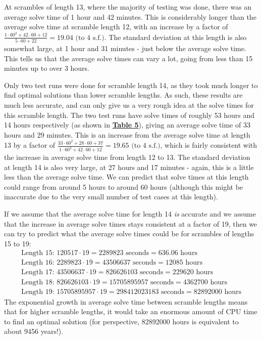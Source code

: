 At scrambles of length 13, where the majority of testing was done, there was an average solve time of 1 hour and 42 minutes. This is considerably longer than the average solve time at scramble length 12, with an increase by a factor of $\frac{1\cdot60^2 + 42\cdot60 + 12}{5\cdot60+22}= 19.04 \text{ (to 4 s.f.)}$. The standard deviation at this length is also somewhat large, at 1 hour and 31 minutes - just below the average solve time. This tells us that the average solve times can vary a lot, going from less than 15 minutes up to over 3 hours.

Only two test runs were done for scramble length 14, as they took much longer to find optimal solutions than lower scramble lengths. As such, these results are much less accurate, and can only give us a very rough idea at the solve times for this scramble length. The two test runs have solve times of roughly 53 hours and 14 hours respectively (as shown in \textbf{\hyperref[tab:results-4]{Table 5}}), giving an average solve time of 33 hours and 29 minutes. This is an increase from the average solve time at length 13 by a factor of $\frac{33\cdot60^2 + 28\cdot60 + 37}{1\cdot60^2 + 42\cdot60 + 12}= 19.65 \text{ (to 4 s.f.)}$, which is fairly consistent with the increase in average solve time from length 12 to 13. The standard deviation at length 14 is also very large, at 27 hours and 17 minutes - again, this is a little less than the average solve time. We can predict that solve times at this length could range from around 5 hours to around 60 hours (although this might be inaccurate due to the very small number of test cases at this length).

If we assume that the average solve time for length 14 \textit{is} accurate and we assume that the increase in average solve times stays consistent at a factor of 19, then we can try to predict what the average solve times could be for scrambles of lengths 15 to 19:
\begin{gather*}
    \text{Length 15: }120517 \cdot 19 = 2289823 \text{ seconds} = 636.06\text{ hours} \\
    \text{Length 16: }2289823 \cdot 19 = 43506637 \text{ seconds} = 12085\text{ hours} \\
    \text{Length 17: }43506637 \cdot 19 = 826626103 \text{ seconds} = 229620\text{ hours} \\
    \text{Length 18: }826626103 \cdot 19 = 15705895957 \text{ seconds} = 4362700\text{ hours} \\
    \text{Length 19: }15705895957 \cdot 19 = 298412023183 \text{ seconds} = 82892000 \text{ hours}
\end{gather*}
The exponential growth in average solve time between scramble lengths means that for higher scramble lengths, it would take an enormous amount of CPU time to find an optimal solution (for perspective, 82892000 hours is equivalent to about 9456 years!).

